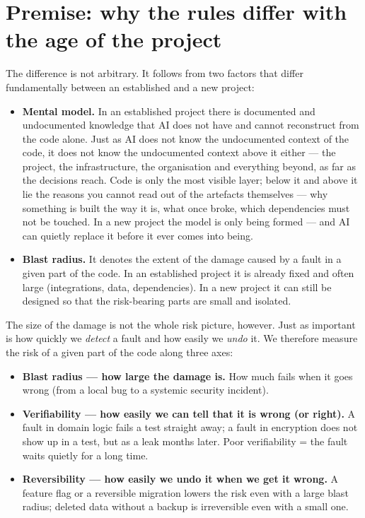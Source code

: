 \section{Premise: why the rules differ with the age of the project}

The difference is not arbitrary.
It follows from two factors that differ fundamentally between an established and a new project:

\begin{itemize}
\item \textbf{Mental model.}
In an established project there is documented and undocumented knowledge that AI does not have and cannot reconstruct from the code alone.
Just as AI does not know the undocumented context of the code, it does not know the undocumented context above it either --- the project, the infrastructure, the organisation and everything beyond, as far as the decisions reach.
Code is only the most visible layer; below it and above it lie the reasons you cannot read out of the artefacts themselves --- why something is built the way it is, what once broke, which dependencies must not be touched.
In a new project the model is only being formed --- and AI can quietly replace it before it ever comes into being.
\item \textbf{Blast radius.}
It denotes the extent of the damage caused by a fault in a given part of the code.
In an established project it is already fixed and often large (integrations, data, dependencies).
In a new project it can still be designed so that the risk-bearing parts are small and isolated.
\end{itemize}

The size of the damage is not the whole risk picture, however.
Just as important is how quickly we \emph{detect} a fault and how easily we \emph{undo} it.
We therefore measure the risk of a given part of the code along three axes:

\begin{itemize}
\item \textbf{Blast radius --- how large the damage is.}
How much fails when it goes wrong (from a local bug to a systemic security incident).
\item \textbf{Verifiability --- how easily we can tell that it is wrong (or right).}
A fault in domain logic fails a test straight away; a fault in encryption does not show up in a test, but as a leak months later.
Poor verifiability = the fault waits quietly for a long time.
\item \textbf{Reversibility --- how easily we undo it when we get it wrong.}
A feature flag or a reversible migration lowers the risk even with a large blast radius; deleted data without a backup is irreversible even with a small one.
\end{itemize}

